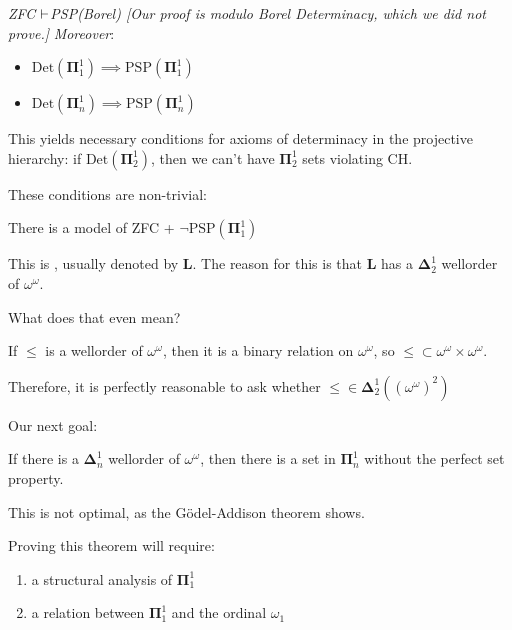 \documentclass[]{article}
\newcommand{\om}{\omega}
\newcommand{\bopi}{\bm{\Pi}}
\newcommand{\bodel}{\bm{\Delta}}
\newcommand{\Det}{\textrm{Det}}
\newcommand{\psp}{\textrm{PSP}}
\begin{document}
\begin{remark*}[Corollary]
    \emph{
        ZFC $\vdash$PSP(Borel)
    [Our proof is modulo Borel Determinacy, which we did not prove.]}
    \emph{Moreover}:
    \begin{itemize}
        \item $\Det(\bopi_1^1) \implies \psp(\bopi_1^1)$
        \item $\Det(\bopi_n^1) \implies \psp(\bopi_n^1)$
    \end{itemize}
\end{remark*}

This yields necessary conditions for axioms of determinacy in the projective hierarchy: if $\Det(\bopi_2^1)$, then we can't have $\bopi_2^1$ sets violating CH.

These conditions are non-trivial:

\begin{theorem*}
    There is a model of ZFC + $\neg \psp(\bopi_1^1)$
\end{theorem*}
\begin{remark*}
    This is , usually denoted by $\mathbf{L}$. The reason for this is that $\mathbf{L}$ has a $\bodel_2^1$ wellorder of $\om^\om$.

    What does that even mean?
    
    If $\le$ is a wellorder of $\om^\om$, then it is a binary relation on $\om^\om$, so $\le \subset \om^\om\times\om^\om$.

    Therefore, it is perfectly reasonable to ask whether $\le \in \bodel^1_2((\om^\om)^2)$
\end{remark*}

Our next goal:

\begin{theorem*}
    If there is a $\bodel_n^1$ wellorder of $\om^\om$, then there is a set in $\bopi^1_n$ without the perfect set property.
\end{theorem*}

\begin{remark*}
    This is not optimal, as the G{\"o}del-Addison theorem shows.
\end{remark*}

Proving this theorem will require:
\begin{enumerate}
    \item a structural analysis of $\bopi^1_1$
    \item a relation between $\bopi^1_1$ and the ordinal $\om_1$
\end{enumerate}
\end{document}
